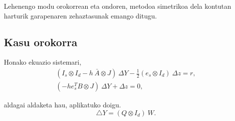 Lehenengo modu orokorrean eta ondoren, metodoa simetrikoa dela kontutan harturik garapenaren zehaztasunak emango ditugu.

\subsection*{Kasu orokorra}
\label{serans:A31}

Honako ekuazio sistemari,
\begin{align}
\label{eqA3:2}
(I_s \otimes I_d- h \ \bar{A} \otimes J) \ \Delta Y - \frac{1}{2}(e_s \otimes I_d) \ \Delta z =r,\\
(-h e_s^T B \otimes J) \ \Delta Y+  \Delta z=0,
\end{align}

aldagai aldaketa hau,  aplikatuko doigu.
\begin{equation}
\label{eqA3:3}
 \triangle Y = (Q \otimes I_d) \ W.
\end{equation}

